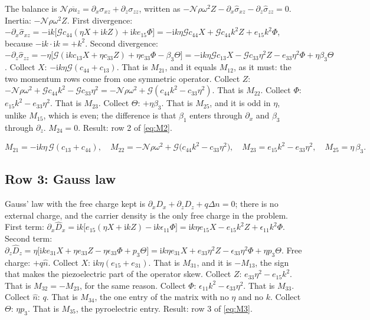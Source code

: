 \documentclass[11pt]{article}
\makeatletter
\newif\ifshowworked
\newenvironment{worked}{%
  \ifshowworked\par\smallskip\noindent\textit{Working.}\par\smallskip\else
  \setbox\z@\vbox\bgroup\fi}{\ifshowworked\par\smallskip\else\egroup\fi}
\newcommand{\ii}{\mathrm{i}}
\newcommand{\Ncal}{\mathcal{N}}
\newcommand{\Gcal}{\mathcal{G}}
\makeatother
\begin{document}
\begin{worked}
The balance is $\Ncal\rho\ddot u_z=\partial_x\sigma_{xz}+\partial_z\sigma_{zz}$, written as
$-\Ncal\rho\omega^2Z-\partial_x\hat\sigma_{xz}-\partial_z\hat\sigma_{zz}=0$.
Inertia: $-\Ncal\rho\omega^2Z$.
First divergence: $-\partial_x\hat\sigma_{xz}=-\ii k\bigl[\Gcal c_{44}(\eta X+\ii kZ)
+\ii k e_{15}\Phi\bigr]=-\ii k\eta\Gcal c_{44}X+\Gcal c_{44}k^2Z+e_{15}k^2\Phi$, because
$-\ii k\cdot\ii k=+k^2$.
Second divergence: $-\partial_z\hat\sigma_{zz}=-\eta\bigl[\Gcal(\ii kc_{13}X+\eta c_{33}Z)
+\eta e_{33}\Phi-\beta_3\Theta\bigr]
=-\ii k\eta\Gcal c_{13}X-\Gcal c_{33}\eta^2Z-e_{33}\eta^2\Phi+\eta\beta_3\Theta$.
Collect $X$: $-\ii k\eta\Gcal(c_{44}+c_{13})$. That is $M_{21}$, and it equals $M_{12}$, as it must:
the two momentum rows come from one symmetric operator.
Collect $Z$: $-\Ncal\rho\omega^2+\Gcal c_{44}k^2-\Gcal c_{33}\eta^2
=-\Ncal\rho\omega^2+\Gcal(c_{44}k^2-c_{33}\eta^2)$. That is $M_{22}$.
Collect $\Phi$: $e_{15}k^2-e_{33}\eta^2$. That is $M_{23}$.
Collect $\Theta$: $+\eta\beta_3$. That is $M_{25}$, and it is odd in $\eta$, unlike $M_{15}$, which is
even; the difference is that $\beta_1$ enters through $\partial_x$ and $\beta_3$ through $\partial_z$.
$M_{24}=0$. Result: row 2 of \eqref{eq:M2}.
\end{worked}

\begin{equation}\label{eq:M2}
M_{21}=-\ii k\eta\,\Gcal(c_{13}+c_{44}),\quad
M_{22}=-\Ncal\rho\omega^2+\Gcal\bigl(c_{44}k^2-c_{33}\eta^2\bigr),\quad
M_{23}=e_{15}k^2-e_{33}\eta^2,\quad
M_{25}=\eta\,\beta_3 .
\end{equation}

\subsection*{Row 3: Gauss law}

\begin{worked}
Gauss' law with the free charge kept is $\partial_xD_x+\partial_zD_z+q\Delta n=0$; there is
no external charge, and the carrier density is the only free charge in the problem.
First term: $\partial_x\hat D_x=\ii k\bigl[e_{15}(\eta X+\ii kZ)-\ii k\epsilon_{11}\Phi\bigr]
=\ii k\eta e_{15}X-e_{15}k^2Z+\epsilon_{11}k^2\Phi$.
Second term: $\partial_z\hat D_z=\eta\bigl[\ii ke_{31}X+\eta e_{33}Z-\eta\epsilon_{33}\Phi
+p_3\Theta\bigr]=\ii k\eta e_{31}X+e_{33}\eta^2Z-\epsilon_{33}\eta^2\Phi+\eta p_3\Theta$.
Free charge: $+q\hat n$.
Collect $X$: $\ii k\eta(e_{15}+e_{31})$. That is $M_{31}$, and it is $-M_{13}$, the sign that makes the
piezoelectric part of the operator skew.
Collect $Z$: $e_{33}\eta^2-e_{15}k^2$. That is $M_{32}=-M_{23}$, for the same reason.
Collect $\Phi$: $\epsilon_{11}k^2-\epsilon_{33}\eta^2$. That is $M_{33}$.
Collect $\hat n$: $q$. That is $M_{34}$, the one entry of the matrix with no $\eta$ and no $k$.
Collect $\Theta$: $\eta p_3$. That is $M_{35}$, the pyroelectric entry.
Result: row 3 of \eqref{eq:M3}.
\end{worked}
\end{document}
